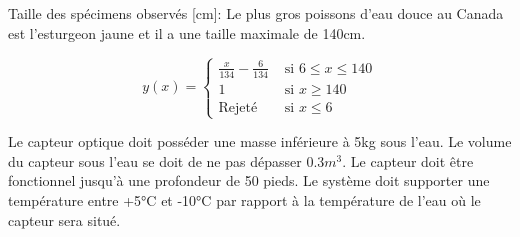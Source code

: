Taille des spécimens observés [cm]:
Le plus gros poissons d'eau douce au Canada est l'esturgeon jaune \cite{Esturgeon} et il a une taille maximale de 140cm.

\begin{equation}
y(x) = \begin{cases}
        \frac{x}{134}- \frac{6}{134} & \text{ si } 6 \leq x \leq 140\\
        1 & \text{ si } x \geq 140\\
        \text{Rejeté} & \text{ si } x \le 6
    \end{cases}
    \label{eq:bareme_taille_poisson}
\end{equation}

Le capteur optique doit posséder une masse inférieure à 5kg sous l'eau. Le volume du capteur sous l'eau se doit de ne pas dépasser 0.3$m^{3}$. Le capteur doit être fonctionnel jusqu'à une profondeur de 50 pieds. Le système doit supporter une température entre +5°C et -10°C par rapport à la température de l'eau où le capteur sera situé.




